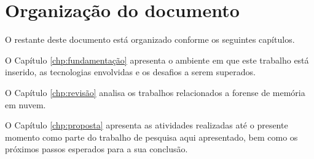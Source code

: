 \section{Organização do documento}
\label{sec:intro-organizacao}

O restante deste documento está organizado conforme os seguintes capítulos.

O Capítulo \ref{chp:fundamentação} apresenta o ambiente em que este trabalho está inserido, as tecnologias envolvidas e os desafios a serem superados. 

O Capítulo \ref{chp:revisão} analisa os trabalhos relacionados a forense de memória em nuvem. 

O Capítulo \ref{chp:proposta} apresenta as atividades realizadas até o presente momento como parte do trabalho de pesquisa aqui apresentado, bem como os próximos passos esperados para a sua conclusão.